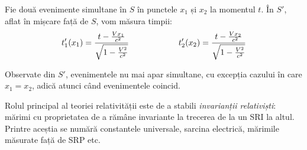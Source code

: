 Fie două evenimente simultane în $S$ în punctele $x_1$ și $x_2$ la momentul
$t$. În $S'$, aflat în mișcare față de $S$, vom măsura timpii:
\begin{equation*}
    \begin{aligned}[t]
        t_1'(x_1) = \frac{t - \frac{Vx_1}{c^2}}{\sqrt{1 - \frac{V^2}{c^2}}}
    \end{aligned}
    \qquad\qquad\qquad
    \begin{aligned}[t]
        t_2'(x_2) = \frac{t - \frac{Vx_2}{c^2}}{\sqrt{1 - \frac{V^2}{c^2}}}
    \end{aligned}
\end{equation*}

Observate din $S'$, evenimentele nu mai apar simultane, cu excepția cazului în
care \( x_1 = x_2 \), adică atunci când evenimentele coincid.

Rolul principal al teoriei relativității este de a stabili
\emph{invarianții relativiști}: mărimi cu proprietatea de a rămâne invariante
la trecerea de la un SRI la altul. Printre aceștia se numără constantele
universale, sarcina electrică, mărimile măsurate față de SRP etc.


